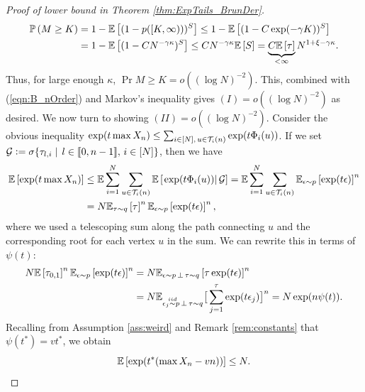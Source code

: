 \begin{proof}[Proof of lower bound in Theorem \ref{thm:ExpTails_BrunDer}]
\begin{align}
\Pr{M \geq K} &= 1 - \Ex{(1 - p([K, \infty)))^{S}} \leq 1 - \Ex{(1 - C \exp(-\gamma K))^S} \\
			  &= 1 - \Ex{(1 - C N^{-\gamma \kappa})^S} \leq C N^{-\gamma \kappa} \Ex{S} = \underbrace{C \Ex{\tau}}_{< \infty} N^{1 + \xi - \gamma \kappa}. 
\end{align} 
Thus, for large enough $\kappa$, $\Pr{M \geq K} = o((\log N)^{-2})$. This, combined with (\ref{eqn:B_nOrder}) and Markov's inequality gives $(I) = o((\log N)^{-2})$ as desired. We now turn to showing $(II) = o((\log N)^{-2})$. Consider the obvious inequality $\exp(t \max X_n) \leq \sum_{i \in [N],\, u \in \cal{T}_i(n)} \exp(t \Phi_i(u))$. If we set $\cal{G} \defeq \sigma\{ \tau_{l, i} \mid\, l\in\bbracket{0,n-1},\, i \in [N]\}$, then we have
\begin{align}
\Ex{\exp(t \max X_n)} &\leq \E \sum\limits_{i=1}^N \sum\limits_{u \in \cal{T}_i(n)} \ExCond{\exp(t \Phi_i(u))}{\cal{G}} = \E \sum\limits_{i=1}^N \sum\limits_{u \in \cal{T}_i(n)} \E_{\epsilon \sim p} \left[\exp(t \epsilon)\right]^n \\
 					  &= N \E_{\tau \sim q}\left[\tau\right]^n \E_{\epsilon \sim p}\left[\exp(t \epsilon)\right]^n, 
\end{align}
where we used a telescoping sum along the path connecting $u$ and the corresponding root for each vertex $u$ in the sum. We can rewrite this in terms of $\psi(t)$:
\begin{align}
N \Ex{\tau_{0,1}}^n \E_{\epsilon \sim p}\left[\exp(t \epsilon)\right]^n &= N \E_{\epsilon \sim p\,\perp\, \tau \sim q}\left[\tau \exp(t \epsilon)\right]^n \\
			&= N \E_{ \epsilon_j \stackrel{\mathclap{iid}}{\sim} p\,\perp\, \tau \sim q} \big[ \sum\limits^{\tau}_{j = 1} \exp(t \epsilon_j) \big]^n = N \exp(n \psi(t)). 
\end{align}
Recalling from Assumption \ref{ass:weird} and Remark \ref{rem:constants} that $\psi(t^*) = v t^*$, we obtain
\begin{equation} \label{eqn:ExpTailT*bound}
\Ex{\exp(t^* (\max X_n - vn))} \leq N.   
\end{equation}


\end{proof}
